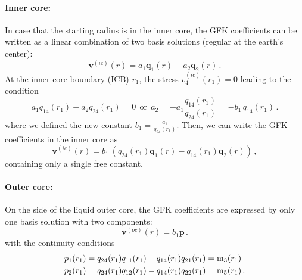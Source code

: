 \documentclass[12pt,a4paper]{article}
\begin{document}
\paragraph{Inner core:}
In case that the starting radius is in the inner core, the GFK coefficients can be written as a linear combination of two basis solutions (regular at the earth's center):
\begin{equation}
\mathbf{v}^{(ic)}(r) = a_1 \mathbf{q}_1(r)+a_2 \mathbf{q}_2(r) \,.
\end{equation}
At the inner core boundary (ICB) $r_1$, the stress $v^{(ic)}_4(r_1) = 0$ leading to the condition
\begin{equation}
a_1 q_{14}(r_1)+a_2 q_{24}(r_1) = 0\ \ \mathrm{or}\ \ a_2 = -a_1\frac{q_{14}(r_1)}{q_{24}(r_1)} = -b_1\,q_{14}(r_1)\,.
\end{equation}
where we defined the new constant $b_1 = \frac{a_1}{q_{24}(r_1)}$. Then,
we can write the GFK coefficients in the inner core as
\begin{equation}
\mathbf{v}^{(ic)}(r) = b_1\ (q_{24}(r_1)\mathbf{q}_1(r) - q_{14}(r_1) \mathbf{q}_2(r)) \,,
\end{equation}
containing only a single free constant. 
%
\paragraph{Outer core:}
On the side of the liquid outer core, the GFK coefficients are expressed by only one basis solution with two components:
\begin{equation}
\mathbf{v}^{(oc)}(r) = b_1 \mathbf{p} \,.
\end{equation}
with the continuity conditions
\begin{align}
p_1(r_1) &= q_{24}(r_1)q_{11}(r_1) - q_{14}(r_1) q_{21}(r_1) = \mathrm{m}_3(r_1) \\\notag
p_2(r_1) &= q_{24}(r_1)q_{12}(r_1) - q_{14}(r_1) q_{22}(r_1) = \mathrm{m}_5(r_1) \,.
\end{align}
%
\end{document}
